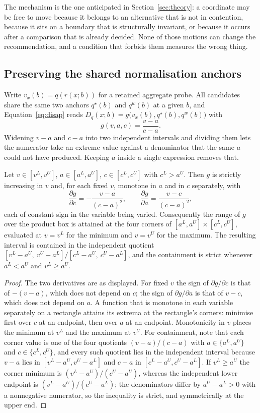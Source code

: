 The mechanism is the one anticipated in Section~\ref{sec:theory}: a coordinate
may be free to move because it belongs to an alternative that is not in
contention, because it sits on a boundary that is structurally invariant, or
because it occurs after a comparison that is already decided. None of those
motions can change the recommendation, and a condition that forbids them
measures the wrong thing.

\subsection{Preserving the shared normalisation anchors}
Write $v_x(b)=q(r(x;b))$ for a retained aggregate probe. All candidates share
the same two anchors $q^\star(b)$ and $q^w(b)$ at a given $b$, and
Equation~\eqref{eq:disap} reads $D_q(x;b)=g\bigl(v_x(b),q^\star(b),q^w(b)\bigr)$
with
\begin{equation}
g(v,a,c)=\frac{v-a}{c-a}.
\label{eq:sharedquotient}
\end{equation}
Widening $v-a$ and $c-a$ into two independent intervals and dividing them lets
the numerator take an extreme value against a denominator that the same $a$
could not have produced. Keeping $a$ inside a single expression removes that.

\begin{proposition}
\label{prop:sharedanchor}
Let $v\in[v^L,v^U]$, $a\in[a^L,a^U]$, $c\in[c^L,c^U]$ with $c^L>a^U$. Then
$g$ is strictly increasing in $v$ and, for each fixed $v$, monotone in $a$ and
in $c$ separately, with
\[
\frac{\partial g}{\partial c}=-\frac{v-a}{(c-a)^2},\qquad
\frac{\partial g}{\partial a}=\frac{v-c}{(c-a)^2},
\]
each of constant sign in the variable being varied. Consequently the range of
$g$ over the product box is attained at the four corners of
$[a^L,a^U]\times[c^L,c^U]$, evaluated at $v=v^L$ for the minimum and $v=v^U$
for the maximum. The resulting interval is contained in the independent
quotient $[v^L-a^U,\ v^U-a^L]/[c^L-a^U,\ c^U-a^L]$, and the containment is
strict whenever $a^L<a^U$ and $v^L\ge a^U$.
\end{proposition}
\begin{proof}
The two derivatives are as displayed. For fixed $v$ the sign of
$\partial g/\partial c$ is that of $-(v-a)$, which does not depend on $c$; the
sign of $\partial g/\partial a$ is that of $v-c$, which does not depend on $a$.
A function that is monotone in each variable separately on a rectangle attains
its extrema at the rectangle's corners: minimise first over $c$ at an endpoint,
then over $a$ at an endpoint. Monotonicity in $v$ places the minimum at $v^L$
and the maximum at $v^U$. For containment, note that each corner value is one
of the four quotients $(v-a)/(c-a)$ with $a\in\{a^L,a^U\}$ and
$c\in\{c^L,c^U\}$, and every such quotient lies in the independent interval
because $v-a$ lies in $[v^L-a^U,v^U-a^L]$ and $c-a$ in $[c^L-a^U,c^U-a^L]$. If
$v^L\ge a^U$ the corner minimum is $(v^L-a^U)/(c^U-a^U)$, whereas the
independent lower endpoint is $(v^L-a^U)/(c^U-a^L)$; the denominators differ by
$a^U-a^L>0$ with a nonnegative numerator, so the inequality is strict, and
symmetrically at the upper end.
\end{proof}

